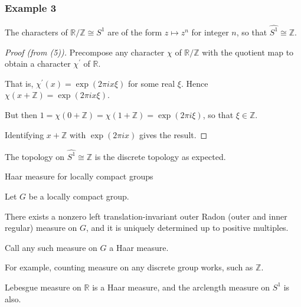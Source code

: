\documentclass[mathserif
, handout
]{beamer}
\begin{document}
\begin{frame}
    \frametitle{Example 3}
The characters of $\mathbb{R}/\mathbb{Z}\cong S^1$ are of the form $z\mapsto z^n$ for integer $n$, so that $\widehat{S^1}\cong \mathbb{Z}$. \pause \begin{proof}[Proof (from (5))]
    Precompose any character $\chi$ of $\mathbb{R}/\mathbb{Z}$ with the quotient map to obtain a character $\chi^\prime$ of $\mathbb{R}$.\pause 

    That is, $\chi^\prime(x) = \exp(2\pi i x\xi)$ for some real $\xi$. Hence $\chi(x+\mathbb{Z}) = \exp(2\pi i x\xi)$.\pause 

    But then $1 = \chi(0 + \mathbb Z) = \chi(1 + \mathbb Z) = \exp(2\pi i \xi)$, so that $\xi\in \mathbb{Z}$. \pause 

    Identifying $x+\mathbb{Z}$ with $\exp(2\pi i x)$ gives the result.
\end{proof} \pause
The topology on $\widehat{S^1}\cong\mathbb{Z}$ is the discrete topology as expected.
\end{frame}

\begin{frame}{Haar measure for locally compact groups}
    \begin{Theorem}[Haar]
        Let $G$ be a locally compact group. \pause 

        There exists a nonzero left translation-invariant outer Radon (outer and inner regular) measure on $G$, and it is uniquely determined up to positive multiples.

        Call any such measure on $G$ a Haar measure.
    \end{Theorem}
    \pause

    For example, counting measure on any discrete group works, such as $\mathbb{Z}$. 
    \pause 

    Lebesgue measure on $\mathbb{R}$ is a Haar measure, and the arclength measure on $S^1$ is also.
\end{frame}
\end{document}
